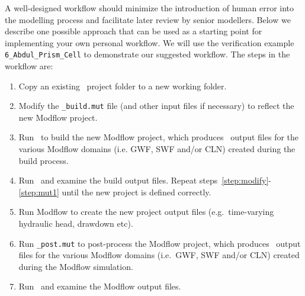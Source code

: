 \label{Appendix:SuggestedWorkflow}A well-designed workflow should minimize the introduction of human error into the modelling process and facilitate later review by senior modellers.   Below we describe one possible approach that can be used as a starting point for implementing your own personal workflow.  We will use the verification example \verb+6_Abdul_Prism_Cell+ to demonstrate our suggested workflow. The steps in the workflow are:
\begin{enumerate}
    \item Copy an existing \mut\ project folder to a new working folder. \label{step:copy}
    \item Modify the \verb+_build.mut+ file (and other input files if necessary) to reflect the new Modflow project.\label{step:modify}
    \item Run \mut\ to build the new Modflow project, which produces \tecplot\ output files for the various Modflow domains (i.e. GWF, SWF and/or CLN) created during the build process. \label{step:mut1}
    \item Run \tecplot\ and examine the build output files.   Repeat steps~\ref{step:modify}-\ref{step:mut1} until the new project is defined correctly.\label{step:Tecplot1}
    \item Run Modflow to create the new project output files (e.g.\ time-varying hydraulic head, drawdown etc).\label{step:modflow}
    \item Run \verb+_post.mut+ to post-process the Modflow project, which produces \tecplot\ output files for the various Modflow domains (i.e.\ GWF, SWF and/or CLN) created during the Modflow simulation.\label{step:mut2}
    \item Run \tecplot\ and examine the Modflow output files.   \label{step:Tecplot2}
\end{enumerate}

